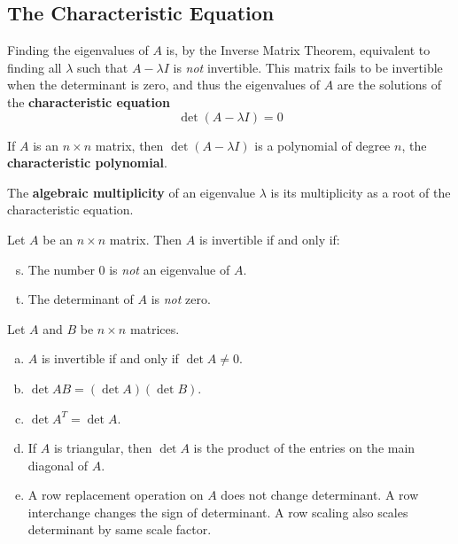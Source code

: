\documentclass[11pt]{scrartcl}
\theoremstyle{dotlessP}
\theoremstyle{dotlessN}
\begin{document}
\subsection{The Characteristic Equation}
\begin{definition}
	Finding the eigenvalues of $A$ is, by the Inverse Matrix Theorem, equivalent to finding all $\lambda$ such that $A - \lambda I$ is \textit{not} invertible. This matrix fails to be invertible when the determinant is zero, and thus the eigenvalues of $A$ are the solutions of the \textbf{characteristic equation}
		\[
		\det(A - \lambda I) = 0
		\] 
\end{definition}
\begin{definition}
	If $A$ is an $n \times n$ matrix, then $\det(A - \lambda I)$ is a polynomial of degree $n$, the \textbf{characteristic polynomial}.
\end{definition}
\begin{definition}
	The \textbf{algebraic multiplicity} of an eigenvalue $\lambda$ is its multiplicity as a root of the characteristic equation.
\end{definition}
\begin{theorem}
	Let $A$ be an $n \times n$ matrix. Then $A$ is invertible if and only if:
	\begin{enumerate}[a.]
		\setcounter{enumi}{18}
		\item The number 0 is \textit{not} an eigenvalue of $A$.
		\item The determinant of $A$ is \textit{not} zero.
	\end{enumerate}
\end{theorem}
\begin{theorem}
	Let $A$ and $B$ be $n \times n$ matrices.
	\begin{enumerate}[a.]
		\item $A$ is invertible if and only if $\det A \neq 0$.
		\item $\det AB = (\det A)(\det B)$. 
		\item  $\det A^T = \det A$.
		\item If  $A$ is triangular, then $\det A$ is the product of the entries on the main diagonal of $A$.
		\item A row replacement operation on $A$ does not change determinant. A row interchange changes the sign of determinant. A row scaling also scales determinant by same scale factor.
	\end{enumerate}
\end{theorem}
\end{document}
